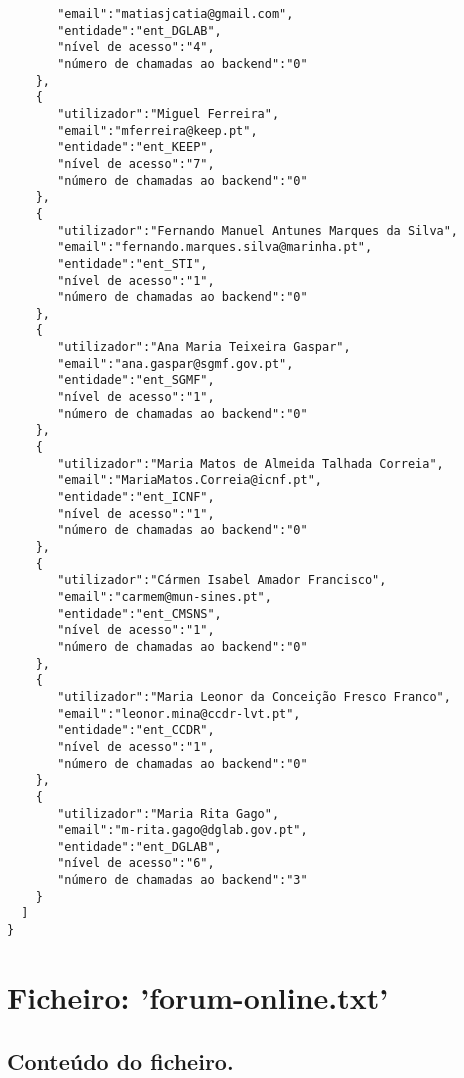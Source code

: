 \documentclass[11pt,a4paper]{report}%
\begin{document}
\begin{verbatim}
       "email":"matiasjcatia@gmail.com",
       "entidade":"ent_DGLAB",
       "nível de acesso":"4",
       "número de chamadas ao backend":"0"
    },
    {
       "utilizador":"Miguel Ferreira",
       "email":"mferreira@keep.pt",
       "entidade":"ent_KEEP",
       "nível de acesso":"7",
       "número de chamadas ao backend":"0"
    },
    {
       "utilizador":"Fernando Manuel Antunes Marques da Silva",
       "email":"fernando.marques.silva@marinha.pt",
       "entidade":"ent_STI",
       "nível de acesso":"1",
       "número de chamadas ao backend":"0"
    },
    {
       "utilizador":"Ana Maria Teixeira Gaspar",
       "email":"ana.gaspar@sgmf.gov.pt",
       "entidade":"ent_SGMF",
       "nível de acesso":"1",
       "número de chamadas ao backend":"0"
    },
    {
       "utilizador":"Maria Matos de Almeida Talhada Correia",
       "email":"MariaMatos.Correia@icnf.pt",
       "entidade":"ent_ICNF",
       "nível de acesso":"1",
       "número de chamadas ao backend":"0"
    },
    {
       "utilizador":"Cármen Isabel Amador Francisco",
       "email":"carmem@mun-sines.pt",
       "entidade":"ent_CMSNS",
       "nível de acesso":"1",
       "número de chamadas ao backend":"0"
    },
    {
       "utilizador":"Maria Leonor da Conceição Fresco Franco",
       "email":"leonor.mina@ccdr-lvt.pt",
       "entidade":"ent_CCDR",
       "nível de acesso":"1",
       "número de chamadas ao backend":"0"
    },
    {
       "utilizador":"Maria Rita Gago",
       "email":"m-rita.gago@dglab.gov.pt",
       "entidade":"ent_DGLAB",
       "nível de acesso":"6",
       "número de chamadas ao backend":"3"
    }
  ]
}

\end{verbatim}


\section{Ficheiro: 'forum-online.txt'}
\subsection{Conteúdo do ficheiro.}
\end{document}
